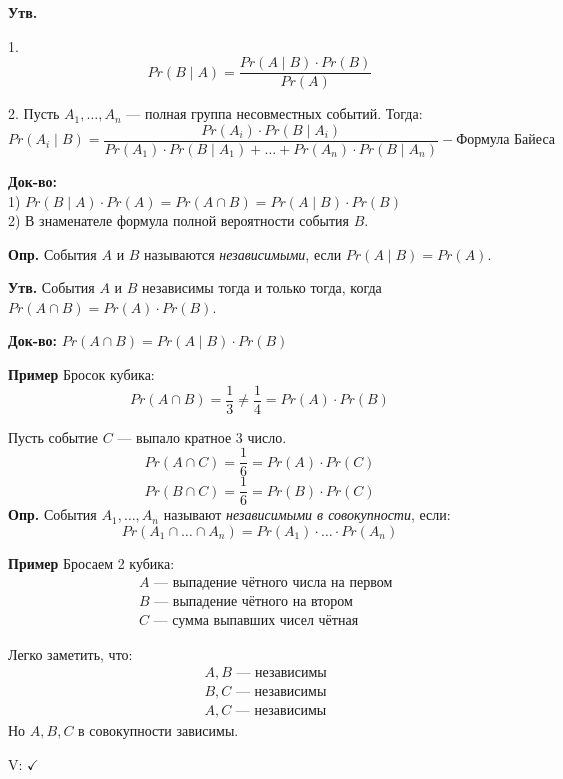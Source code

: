 \documentclass[10pt, a4paper]{article}
\begin{document}
\noindent
\textbf{Утв.} 

1.\[
Pr(B \mid A) = \frac{Pr(A \mid B) \cdot Pr(B)}{Pr(A)}
\]

2. Пусть $A_1, \dots, A_n$ — полная группа несовместных событий. Тогда:
\[
Pr(A_i \mid B) = \frac{Pr(A_i) \cdot Pr(B \mid A_i)}{Pr(A_1) \cdot Pr(B \mid A_1) + \dots + Pr(A_n) \cdot Pr(B \mid A_n)} - \textbf{Формула Байеса}
\]

\vspace{0.5em}
\noindent
\textbf{Док-во:} \\
1) $Pr(B \mid A) \cdot Pr(A) = Pr(A \cap B) = Pr(A \mid B) \cdot Pr(B)$ \\
2) В знаменателе формула полной вероятности события $B$.

\medskip
\noindent \textbf{Опр.} События $A$ и $B$ называются \textit{независимыми}, если $Pr(A \mid B) = Pr(A)$.

\vspace{0.5em}
\noindent \textbf{Утв.} События $A$ и $B$ независимы тогда и только тогда, когда $Pr(A \cap B) = Pr(A) \cdot Pr(B)$.

\vspace{0.5em}
\noindent \textbf{Док-во:} $Pr(A \cap B) = Pr(A \mid B) \cdot Pr(B)$

\vspace{0.5em}
\noindent \textbf{Пример} Бросок кубика:
\[
Pr(A \cap B) = \frac{1}{3} \neq \frac{1}{4} = Pr(A) \cdot Pr(B)
\]

\vspace{0.5em}
\noindent Пусть событие $C$ — выпало кратное 3 число.
\[
Pr(A \cap C) = \frac{1}{6} = Pr(A) \cdot Pr(C)
\]
\[
Pr(B \cap C) = \frac{1}{6} = Pr(B) \cdot Pr(C)
\]
\noindent \textbf{Опр.} События $A_1, \dots, A_n$ называют \textit{независимыми в совокупности}, если:
\[
Pr(A_1 \cap \dots \cap A_n) = Pr(A_1) \cdot \dots \cdot Pr(A_n)
\]

\vspace{0.5em}
\noindent \textbf{Пример} Бросаем 2 кубика: \\
\begin{align*}
& A \text{ — выпадение чётного числа на первом} \\
& B \text{ — выпадение чётного на втором} \\
& C \text{ — сумма выпавших чисел чётная}
\end{align*}

\vspace{0.5em}
\noindent
Легко заметить, что:
\begin{align*}
& A, B \text{ — независимы} \\
& B, C \text{ — независимы} \\
& A, C \text{ — независимы}
\end{align*}
Но $A, B, C$ в совокупности зависимы.

{\color{gray} V: $\checkmark$}
\end{document}
